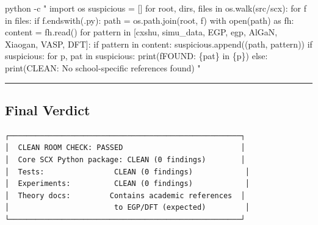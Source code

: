 \documentclass[
  12pt,
]{article}
\newenvironment{Shaded}{}{}
\newcommand{\AttributeTok}[1]{\textcolor[rgb]{0.49,0.56,0.16}{#1}}
\newcommand{\ExtensionTok}[1]{#1}
\newcommand{\StringTok}[1]{\textcolor[rgb]{0.25,0.44,0.63}{#1}}
\begin{document}
\begin{Shaded}
\begin{Highlighting}[]
\ExtensionTok{python} \AttributeTok{{-}c} \StringTok{"}
\StringTok{import os}
\StringTok{suspicious = []}
\StringTok{for root, dirs, files in os.walk(\textquotesingle{}src/scx\textquotesingle{}):}
\StringTok{    for f in files:}
\StringTok{        if f.endswith(\textquotesingle{}.py\textquotesingle{}):}
\StringTok{            path = os.path.join(root, f)}
\StringTok{            with open(path) as fh:}
\StringTok{                content = fh.read()}
\StringTok{            for pattern in [\textquotesingle{}cxshu\textquotesingle{}, \textquotesingle{}simu\_data\textquotesingle{}, \textquotesingle{}EGP\textquotesingle{}, \textquotesingle{}egp\textquotesingle{}, \textquotesingle{}AlGaN\textquotesingle{}, \textquotesingle{}Xiaogan\textquotesingle{}, \textquotesingle{}VASP\textquotesingle{}, \textquotesingle{}DFT\textquotesingle{}]:}
\StringTok{                if pattern in content:}
\StringTok{                    suspicious.append((path, pattern))}
\StringTok{if suspicious:}
\StringTok{    for p, pat in suspicious:}
\StringTok{        print(f\textquotesingle{}FOUND: \{pat\} in \{p\}\textquotesingle{})}
\StringTok{else:}
\StringTok{    print(\textquotesingle{}CLEAN: No school-specific references found\textquotesingle{})}
\StringTok{"}
\end{Highlighting}
\end{Shaded}

\begin{center}\rule{0.5\linewidth}{0.5pt}\end{center}

\subsection{Final Verdict}\label{final-verdict}

\begin{verbatim}
┌─────────────────────────────────────────────────────┐
│  CLEAN ROOM CHECK: PASSED                           │
│  Core SCX Python package: CLEAN (0 findings)        │
│  Tests:                CLEAN (0 findings)            │
│  Experiments:          CLEAN (0 findings)            │
│  Theory docs:         Contains academic references  │
│                        to EGP/DFT (expected)         │
└─────────────────────────────────────────────────────┘
\end{verbatim}
\end{document}
